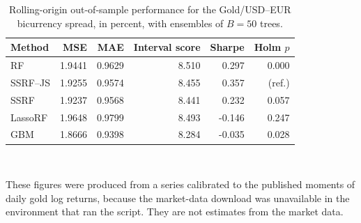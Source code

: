 \begin{table}[htbp]
\centering
\caption{Rolling-origin out-of-sample performance for the Gold/USD--EUR bicurrency spread, in percent, with ensembles of $B=50$ trees.}
\label{tab:bic_B50}
\small
\setlength{\tabcolsep}{5pt}
\begin{tabular}{lrrrrr}
\toprule
Method & MSE & MAE & Interval score & Sharpe & Holm $p$ \\
\midrule
RF & 1.9441 & 0.9629 & 8.510 & 0.297 & 0.000 \\
SSRF--JS & 1.9255 & 0.9574 & 8.455 & 0.357 & (ref.) \\
SSRF & 1.9237 & 0.9568 & 8.441 & 0.232 & 0.057 \\
LassoRF & 1.9648 & 0.9799 & 8.493 & -0.146 & 0.247 \\
GBM & 1.8666 & 0.9398 & 8.284 & -0.035 & 0.028 \\
\bottomrule
\end{tabular}
\\[2pt]
\parbox{\textwidth}{\footnotesize These figures were produced from a series calibrated to the published moments of daily gold log returns, because the market-data download was unavailable in the environment that ran the script. They are not estimates from the market data.}
\end{table}

